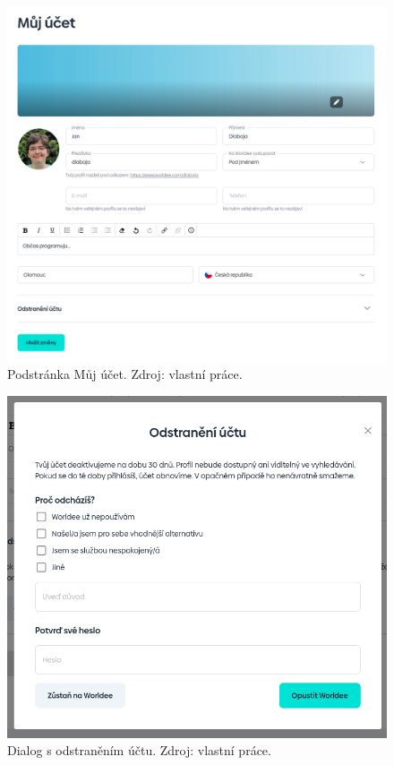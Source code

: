 \begin{figure}
    \centering
    \includegraphics[width=1\linewidth]{obrazky/account.png}
    \caption{Podstránka Můj účet. Zdroj: vlastní práce.}
\end{figure}

\begin{figure}
    \centering
    \includegraphics[width=1\linewidth]{obrazky/delete_account.png}
    \caption{Dialog s odstraněním účtu. Zdroj: vlastní práce.}
\end{figure}


